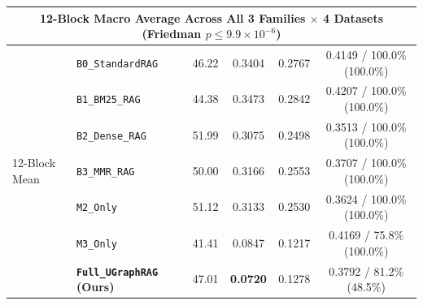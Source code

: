 \documentclass[11pt]{article}
\begin{document}
\begin{table}[t]
{{\begin{tabular}{llcccc}
\midrule
\multicolumn{6}{c}{\textbf{12-Block Macro Average Across All 3 Families $\times$ 4 Datasets (Friedman $p \le 9.9\times 10^{-6}$)}} \\
\midrule
\multirow{7}{*}{12-Block Mean} & \texttt{B0\_StandardRAG} & 46.22 & 0.3404 & 0.2767 & 0.4149 / 100.0\% (100.0\%) \\
 & \texttt{B1\_BM25\_RAG} & 44.38 & 0.3473 & 0.2842 & 0.4207 / 100.0\% (100.0\%) \\
 & \texttt{B2\_Dense\_RAG} & 51.99 & 0.3075 & 0.2498 & 0.3513 / 100.0\% (100.0\%) \\
 & \texttt{B3\_MMR\_RAG} & 50.00 & 0.3166 & 0.2553 & 0.3707 / 100.0\% (100.0\%) \\
 & \texttt{M2\_Only} & 51.12 & 0.3133 & 0.2530 & 0.3624 / 100.0\% (100.0\%) \\
 & \texttt{M3\_Only} & 41.41 & 0.0847 & 0.1217 & 0.4169 / 75.8\% (100.0\%) \\
& \textbf{\texttt{Full\_UGraphRAG} (Ours)} & 47.01 & \textbf{0.0720} & 0.1278 & 0.3792 / 81.2\% (48.5\%) \\
\bottomrule
\end{tabular}
}}
\end{table}
\end{document}
